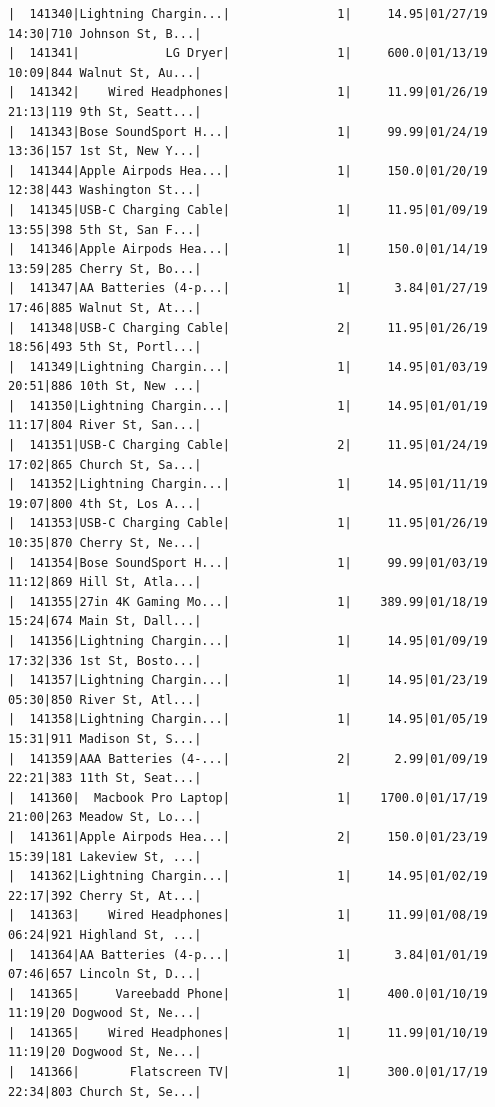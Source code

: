 \documentclass[
  letterpaper,
  DIV=11,
  numbers=noendperiod]{scrartcl}
\begin{document}
\begin{verbatim}
|  141340|Lightning Chargin...|               1|     14.95|01/27/19 14:30|710 Johnson St, B...|
|  141341|            LG Dryer|               1|     600.0|01/13/19 10:09|844 Walnut St, Au...|
|  141342|    Wired Headphones|               1|     11.99|01/26/19 21:13|119 9th St, Seatt...|
|  141343|Bose SoundSport H...|               1|     99.99|01/24/19 13:36|157 1st St, New Y...|
|  141344|Apple Airpods Hea...|               1|     150.0|01/20/19 12:38|443 Washington St...|
|  141345|USB-C Charging Cable|               1|     11.95|01/09/19 13:55|398 5th St, San F...|
|  141346|Apple Airpods Hea...|               1|     150.0|01/14/19 13:59|285 Cherry St, Bo...|
|  141347|AA Batteries (4-p...|               1|      3.84|01/27/19 17:46|885 Walnut St, At...|
|  141348|USB-C Charging Cable|               2|     11.95|01/26/19 18:56|493 5th St, Portl...|
|  141349|Lightning Chargin...|               1|     14.95|01/03/19 20:51|886 10th St, New ...|
|  141350|Lightning Chargin...|               1|     14.95|01/01/19 11:17|804 River St, San...|
|  141351|USB-C Charging Cable|               2|     11.95|01/24/19 17:02|865 Church St, Sa...|
|  141352|Lightning Chargin...|               1|     14.95|01/11/19 19:07|800 4th St, Los A...|
|  141353|USB-C Charging Cable|               1|     11.95|01/26/19 10:35|870 Cherry St, Ne...|
|  141354|Bose SoundSport H...|               1|     99.99|01/03/19 11:12|869 Hill St, Atla...|
|  141355|27in 4K Gaming Mo...|               1|    389.99|01/18/19 15:24|674 Main St, Dall...|
|  141356|Lightning Chargin...|               1|     14.95|01/09/19 17:32|336 1st St, Bosto...|
|  141357|Lightning Chargin...|               1|     14.95|01/23/19 05:30|850 River St, Atl...|
|  141358|Lightning Chargin...|               1|     14.95|01/05/19 15:31|911 Madison St, S...|
|  141359|AAA Batteries (4-...|               2|      2.99|01/09/19 22:21|383 11th St, Seat...|
|  141360|  Macbook Pro Laptop|               1|    1700.0|01/17/19 21:00|263 Meadow St, Lo...|
|  141361|Apple Airpods Hea...|               2|     150.0|01/23/19 15:39|181 Lakeview St, ...|
|  141362|Lightning Chargin...|               1|     14.95|01/02/19 22:17|392 Cherry St, At...|
|  141363|    Wired Headphones|               1|     11.99|01/08/19 06:24|921 Highland St, ...|
|  141364|AA Batteries (4-p...|               1|      3.84|01/01/19 07:46|657 Lincoln St, D...|
|  141365|     Vareebadd Phone|               1|     400.0|01/10/19 11:19|20 Dogwood St, Ne...|
|  141365|    Wired Headphones|               1|     11.99|01/10/19 11:19|20 Dogwood St, Ne...|
|  141366|       Flatscreen TV|               1|     300.0|01/17/19 22:34|803 Church St, Se...|

\end{verbatim}
\end{document}
